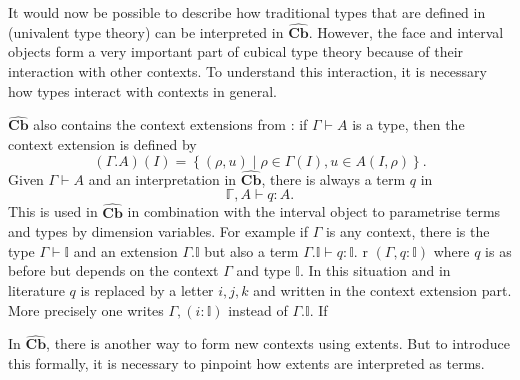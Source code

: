 \documentclass[12pt,a4paper,twoside,xetex]{book} %
\newcommand{\psh}[1]{\widehat{#1}}
\newcommand{\cube}[0]{\textbf{Cb}}
\begin{document}
It would now be possible to describe how traditional types that are defined in 
(univalent type theory) can be interpreted in $\psh{\cube}$. 
However, the face and interval objects form a very important part of cubical 
type theory because of their interaction with other contexts. To understand 
this interaction, it is necessary how types interact with contexts in general.  

$\psh{\cube}$ also contains the context extensions from 
: if $\Gamma \vdash A$ is a type, then the context extension is 
defined by $$(\Gamma . A)(I) = \left\{ (\rho , u ) \mid \rho \in \Gamma (I), u 
\in A (I,\rho) \right\}.$$
Given $\Gamma \vdash A$ and an interpretation in $\psh{\cube}$, there is 
always a term $q$ in $$\mathbb{\Gamma}, A \vdash q : A.$$ This is used in 
$\psh{\cube}$ in combination with the interval object to parametrise 
terms and types by dimension variables. For example if $\Gamma$ is any context, 
there is the type $\Gamma \vdash \mathbb{I}$ and an extension $\Gamma. 
\mathbb{I}$ but also a term $\Gamma. \mathbb{I} \vdash q : \mathbb{I}$.
r $(\Gamma, q : \mathbb{I})$ where $q$ is as before but depends on the context 
$\Gamma$ and type $\mathbb{I}$. In this situation and in literature $q$ is 
replaced by a letter $i,j,k$ and written in the context extension part. More 
precisely one writes $\Gamma, (i: \mathbb{I})$ instead of $\Gamma . 
\mathbb{I}$. If 

In $\psh{\cube}$, there is another way to form new 
contexts using extents. But to introduce this formally, it is necessary to 
pinpoint how extents are interpreted as terms.
\end{document}
